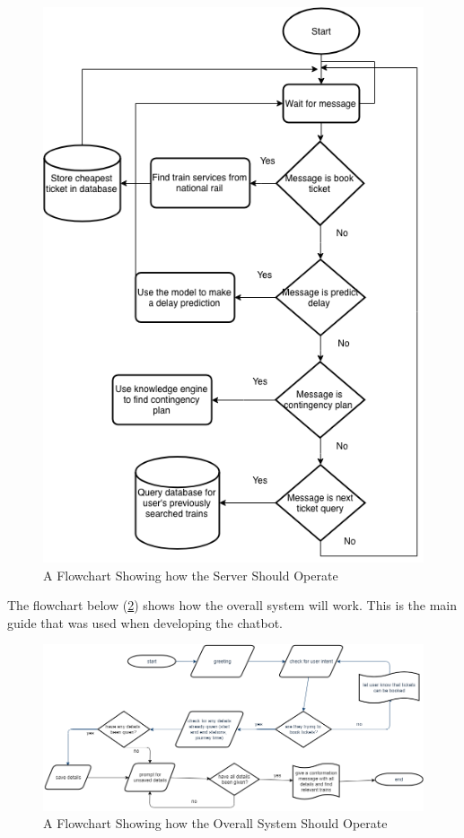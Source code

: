 \documentclass[12pt,a4paper]{article}
\begin{document}
    \begin{figure}[H]
        \centering
        \includegraphics[scale=0.7]{Images/server_flowchart.png}
        \caption{A Flowchart Showing how the Server Should Operate}
        \label{fig:server_flowchat}
    \end{figure}
    
    The flowchart below (\ref{fig:overall_flowchart}) shows how the overall system will work. This is the main guide that was used when developing the chatbot.
    
    \begin{figure}[H]
        \centering
        \includegraphics[scale=0.4]{Images/flowchart_overall.png}
        \caption{A Flowchart Showing how the Overall System Should Operate}
        \label{fig:overall_flowchart}
    \end{figure}
    
\end{document}
